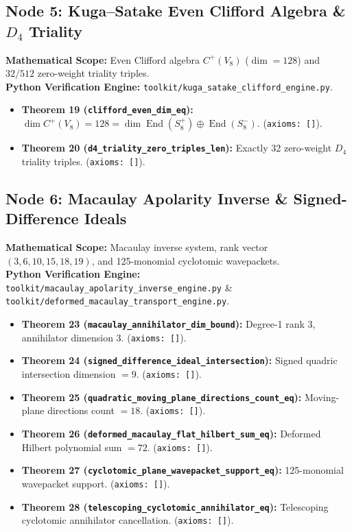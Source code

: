 \documentclass[11pt,a4paper]{article}
\DeclareMathOperator{\End}{End}
\begin{document}
\subsection{Node 5: Kuga--Satake Even Clifford Algebra \& $D_4$ Triality}
\textbf{Mathematical Scope:} Even Clifford algebra $C^+(V_8)$ ($\dim = 128$) and $32/512$ zero-weight triality triples.\\
\textbf{Python Verification Engine:} \texttt{toolkit/kuga\_satake\_clifford\_engine.py}.
\begin{itemize}[leftmargin=1.5em]
\item \textbf{Theorem 19 (\texttt{clifford\_even\_dim\_eq}):} $\dim C^+(V_8) = 128 = \dim \End(S^+_8) \oplus \End(S^-_8)$. (\texttt{axioms: []}).
\item \textbf{Theorem 20 (\texttt{d4\_triality\_zero\_triples\_len}):} Exactly 32 zero-weight $D_4$ triality triples. (\texttt{axioms: []}).
\end{itemize}

\subsection{Node 6: Macaulay Apolarity Inverse \& Signed-Difference Ideals}
\textbf{Mathematical Scope:} Macaulay inverse system, rank vector $(3,6,10,15,18,19)$, and 125-monomial cyclotomic wavepackets.\\
\textbf{Python Verification Engine:} \texttt{toolkit/macaulay\_apolarity\_inverse\_engine.py} \& \texttt{toolkit/deformed\_macaulay\_transport\_engine.py}.
\begin{itemize}[leftmargin=1.5em]
\item \textbf{Theorem 23 (\texttt{macaulay\_annihilator\_dim\_bound}):} Degree-1 rank 3, annihilator dimension 3. (\texttt{axioms: []}).
\item \textbf{Theorem 24 (\texttt{signed\_difference\_ideal\_intersection}):} Signed quadric intersection dimension $= 9$. (\texttt{axioms: []}).
\item \textbf{Theorem 25 (\texttt{quadratic\_moving\_plane\_directions\_count\_eq}):} Moving-plane directions count $= 18$. (\texttt{axioms: []}).
\item \textbf{Theorem 26 (\texttt{deformed\_macaulay\_flat\_hilbert\_sum\_eq}):} Deformed Hilbert polynomial sum $= 72$. (\texttt{axioms: []}).
\item \textbf{Theorem 27 (\texttt{cyclotomic\_plane\_wavepacket\_support\_eq}):} 125-monomial wavepacket support. (\texttt{axioms: []}).
\item \textbf{Theorem 28 (\texttt{telescoping\_cyclotomic\_annihilator\_eq}):} Telescoping cyclotomic annihilator cancellation. (\texttt{axioms: []}).
\end{itemize}
\end{document}
